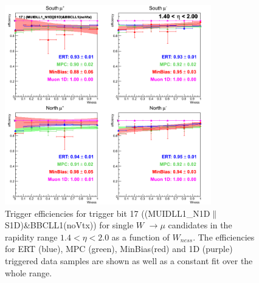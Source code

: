 \begin{figure}[h!]

  \centering

  \includegraphics[width=0.8\textwidth]{./figures/run13_trigeffisn_eta1_trig17_lin.png}
  \caption{\label{fig:run13_trigeffisn_eta1_nper0_trig17_lin} Trigger efficiencies for trigger bit 17 ((MUIDLL1\_N1D$\|$S1D)\&BBCLL1(noVtx)) for single $W$ $\rightarrow \mu$ candidates in the rapidity range $ 1.4 < \eta < 2.0$ as a function of $W_{ness}$. The efficiencies for ERT (blue), MPC (green), MinBias(red) and 1D (purple) triggered data samples are shown as well as a constant fit over the whole range.}

\end{figure}
\clearpage

